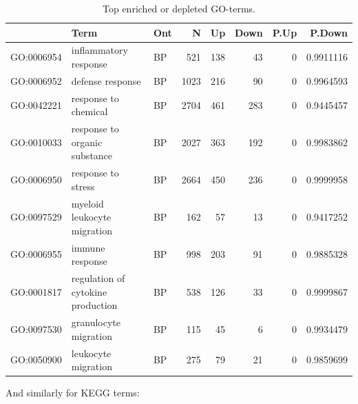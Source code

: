\documentclass[9pt,a4paper,]{extarticle}
\newenvironment{Shaded}{\begin{snugshade}}{\end{snugshade}}
\newcommand{\KeywordTok}[1]{\textcolor[rgb]{0.13,0.29,0.53}{\textbf{{#1}}}}
\newcommand{\DataTypeTok}[1]{\textcolor[rgb]{0.13,0.29,0.53}{{#1}}}
\newcommand{\DecValTok}[1]{\textcolor[rgb]{0.00,0.00,0.81}{{#1}}}
\newcommand{\StringTok}[1]{\textcolor[rgb]{0.31,0.60,0.02}{{#1}}}
\newcommand{\CommentTok}[1]{\textcolor[rgb]{0.56,0.35,0.01}{\textit{{#1}}}}
\newcommand{\OtherTok}[1]{\textcolor[rgb]{0.56,0.35,0.01}{{#1}}}
\newcommand{\NormalTok}[1]{{#1}}
\begin{document}
\begin{table}[t]

\caption{\label{tab:goanna}Top enriched or depleted GO-terms.}
\centering
\begin{tabular}{l|l|l|r|r|r|r|r}
\hline
  & Term & Ont & N & Up & Down & P.Up & P.Down\\
\hline
GO:0006954 & inflammatory response & BP & 521 & 138 & 43 & 0 & 0.9911116\\
\hline
GO:0006952 & defense response & BP & 1023 & 216 & 90 & 0 & 0.9964593\\
\hline
GO:0042221 & response to chemical & BP & 2704 & 461 & 283 & 0 & 0.9445457\\
\hline
GO:0010033 & response to organic substance & BP & 2027 & 363 & 192 & 0 & 0.9983862\\
\hline
GO:0006950 & response to stress & BP & 2664 & 450 & 236 & 0 & 0.9999958\\
\hline
GO:0097529 & myeloid leukocyte migration & BP & 162 & 57 & 13 & 0 & 0.9417252\\
\hline
GO:0006955 & immune response & BP & 998 & 203 & 91 & 0 & 0.9885328\\
\hline
GO:0001817 & regulation of cytokine production & BP & 538 & 126 & 33 & 0 & 0.9999867\\
\hline
GO:0097530 & granulocyte migration & BP & 115 & 45 & 6 & 0 & 0.9934479\\
\hline
GO:0050900 & leukocyte migration & BP & 275 & 79 & 21 & 0 & 0.9859699\\
\hline
\end{tabular}
\end{table}

And similarly for KEGG terms:

\begin{Shaded}
\end{Shaded}
\end{document}
